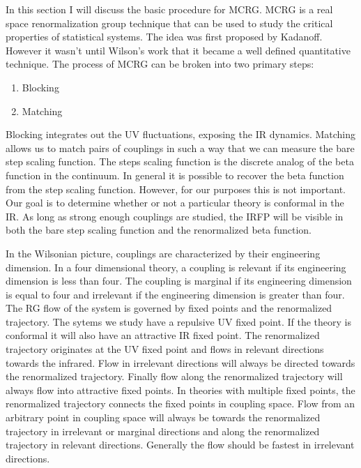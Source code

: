 
In this section I will discuss the basic procedure for MCRG.
MCRG is a real space renormalization group technique that can be used to study the critical properties of statistical systems.
The idea was first proposed by Kadanoff. 
However it wasn't until Wilson's work that it became a well defined quantitative technique.
The process of MCRG can be broken into two primary steps:
\begin{enumerate}
  \item Blocking
  \item Matching
\end{enumerate}
Blocking integrates out the UV fluctuations, exposing the IR dynamics.
Matching allows us to match pairs of couplings in such a way that we can measure the bare step scaling function.
The steps scaling function is the discrete analog of the beta function in the continuum.
In general it is possible to recover the beta function from the step scaling function.
However, for our purposes this is not important.
Our goal is to determine whether or not a particular theory is conformal in the IR.
As long as strong enough couplings are studied, the IRFP will be visible in both the bare step scaling function and the renormalized beta function.

In the Wilsonian picture, couplings are characterized by their engineering dimension.
In a four dimensional theory, a coupling is relevant if its engineering dimension is less than four.
The coupling is marginal if its engineering dimension is equal to four and irrelevant if the engineering dimension is greater than four.
The RG flow of the system is governed by fixed points and the renormalized trajectory.
The sytems we study have a repulsive UV fixed point.
If the theory is conformal it will also have an attractive IR fixed point.
The renormalized trajectory originates at the UV fixed point and flows in relevant directions towards the infrared.
Flow in irrelevant directions will always be directed towards the renormalized trajectory.
Finally flow along the renormalized trajectory will always flow into attractive fixed points.
In theories with multiple fixed points, the renormalized trajectory connects the fixed points in coupling space.
Flow from an arbitrary point in coupling space will always be towards the renormalized trajectory in irrelevant or marginal directions and along the renormalized trajectory in relevant directions.
Generally the flow should be fastest in irrelevant directions.

